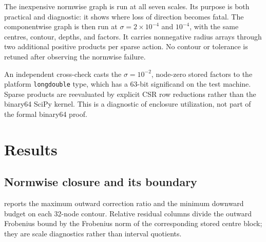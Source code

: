 \documentclass[11pt]{article}
\theoremstyle{definition}
\theoremstyle{remark}
\begin{document}
The inexpensive normwise graph is run at all seven scales.  Its purpose is
both practical and diagnostic: it shows where loss of direction becomes
fatal.  The componentwise graph is then run at
\(\sigma=2\times10^{-4}\) and \(10^{-4}\), with the same centres, contour,
depths, and factors.  It carries nonnegative radius arrays through two
additional positive products per sparse action.  No contour or tolerance
is retuned after observing the normwise failure.

An independent cross-check casts the \(\sigma=10^{-2}\), node-zero stored
factors to the platform \texttt{longdouble} type, which has a 63-bit
significand on the test machine.  Sparse products are reevaluated by
explicit CSR row reductions rather than the binary64 SciPy kernel.  This is
a diagnostic of enclosure utilization, not part of the formal binary64
proof.

\section{Results}
\label{sec:results}

\subsection{Normwise closure and its boundary}

 reports the maximum outward correction ratio and the
minimum downward budget on each 32-node contour.  Relative residual columns
divide the outward Frobenius bound by the Frobenius norm of the corresponding
stored centre block; they are scale diagnostics rather than interval
quotients.
\end{document}
